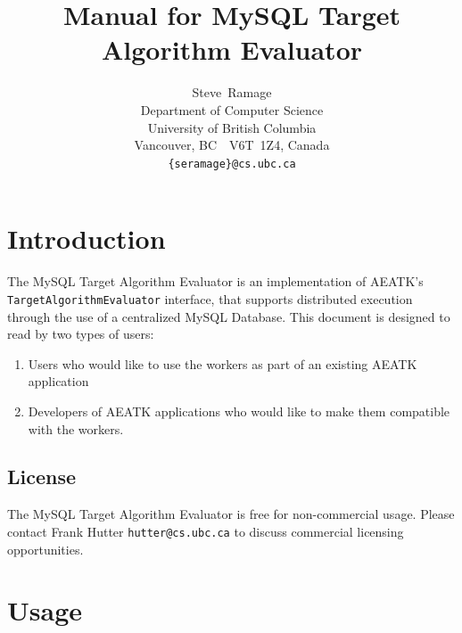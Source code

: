 \documentclass[11pt,letterpaper,oneside]{article}
\begin{document}
\title{Manual for MySQL Target Algorithm Evaluator }
\author{
Steve~Ramage\\
Department of Computer Science\\
University of British Columbia\\
Vancouver, BC\ \ V6T~1Z4, Canada\\
\texttt{\{seramage\}@cs.ubc.ca}
}


\maketitle

\tableofcontents

\section{Introduction}

The MySQL Target Algorithm Evaluator is an implementation of AEATK's \texttt{TargetAlgorithmEvaluator} interface, that supports distributed execution through the use of a centralized MySQL Database. This document is designed to read by two types of users:

\begin{enumerate}
\item Users who would like to use the workers as part of an existing AEATK application
\item Developers of AEATK applications who would like to make them compatible with the workers.
\end{enumerate}

\subsection{License}

The MySQL Target Algorithm Evaluator is free for non-commercial usage. Please contact Frank Hutter \texttt{hutter@cs.ubc.ca} to discuss commercial licensing opportunities.

\section{Usage}

\end{document}
